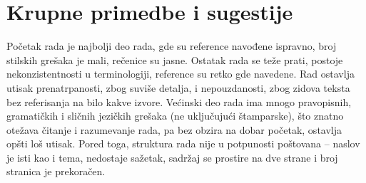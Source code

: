 \documentclass[a4paper]{report}
\begin{document}
\section{Krupne primedbe i sugestije}

Početak rada je najbolji deo rada, gde su reference navođene ispravno, broj stilskih grešaka je mali, rečenice su jasne. Ostatak rada se teže prati, postoje nekonzistentnosti u terminologiji, reference su retko gde navedene. Rad ostavlja utisak prenatrpanosti, zbog suviše detalja, i nepouzdanosti, zbog zidova teksta bez referisanja na bilo kakve izvore. Većinski deo rada ima mnogo pravopisnih, gramatičkih i sličnih jezičkih grešaka (ne uključujući štamparske), što znatno otežava čitanje i razumevanje rada, pa bez obzira na dobar početak, ostavlja opšti loš utisak. Pored toga, struktura rada nije u potpunosti poštovana -- naslov je isti kao i tema, nedostaje sažetak, sadržaj se prostire na dve strane i broj stranica je prekoračen.
\end{document}
